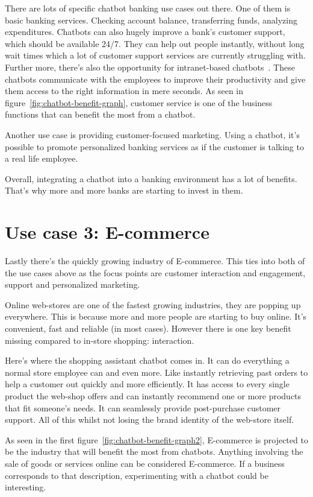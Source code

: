 There are lots of specific chatbot banking use cases out there. One of them is basic banking services. Checking account balance, transferring funds, analyzing expenditures. Chatbots can also hugely improve a bank's customer support, which should be available 24/7. They can help out people instantly, without long wait times which a lot of customer support services are currently struggling with. Further more, there's also the opportunity for intranet-based chatbots~\cite{intranet-chabot}. These chatbots communicate with the employees to improve their productivity and give them access to the right information in mere seconds. As seen in figure~\ref{fig:chatbot-benefit-graph}, customer service is one of the business functions that can benefit the most from a chatbot.

Another use case is providing customer-focused marketing. Using a chatbot, it's possible to promote personalized banking services as if the customer is talking to a real life employee.

Overall, integrating a chatbot into a banking environment has a lot of benefits. That's why more and more banks are starting to invest in them.

\section{Use case 3: E-commerce}

Lastly there's the quickly growing industry of E-commerce. This ties into both of the use cases above as the focus points are customer interaction and engagement, support and personalized marketing.

Online web-stores are one of the fastest growing industries, they are popping up everywhere. This is because more and more people are starting to buy online. It's convenient, fast and reliable (in most cases). However there is one key benefit missing compared to in-store shopping: interaction.

Here's where the shopping assistant chatbot comes in. It can do everything a normal store employee can and even more. Like instantly retrieving past orders to help a customer out quickly and more efficiently. It has access to every single product the web-shop offers and can instantly recommend one or more products that fit someone's needs. It can seamlessly provide post-purchase customer support. All of this whilst not losing the brand identity of the web-store itself.

As seen in the first figure~\ref{fig:chatbot-benefit-graph2}, E-commerce is projected to be the industry that will benefit the most from chatbots. Anything involving the sale of goods or services online can be considered E-commerce. If a business corresponds to that description, experimenting with a chatbot could be interesting.

